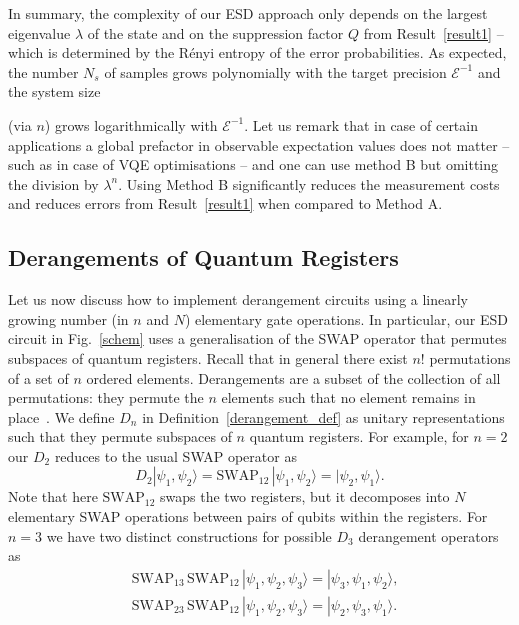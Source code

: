 \documentclass[aps,prx,showpacs,twocolumn,reprint]{revtex4-2}
\begin{document}
In summary, the complexity of our ESD approach only depends on the largest eigenvalue
$\lambda$ of the state and on the suppression factor $Q$ from
Result~\ref{result1} --  which is determined by the R{\'e}nyi entropy of the error probabilities.
As expected, the number $N_s$ of samples grows polynomially with the target precision
$\mathcal{E}^{-1}$ and the system size{(via $n$) grows logarithmically with $\mathcal{E}^{-1}$.
Let us remark that in case of certain applications a global prefactor in observable
expectation values does not matter
-- such as in case of VQE optimisations -- and one can use method B but omitting the division by $\lambda^n$. 
Using Method B significantly reduces the measurement costs and reduces errors from Result~\ref{result1}
when compared to Method A.




\subsection{Derangements of Quantum Registers}

Let us now discuss how to implement derangement circuits using a linearly growing number (in
$n$ and $N$) elementary gate operations. In particular, our
ESD circuit in Fig.~\ref{schem} uses a
generalisation of the SWAP operator that permutes subspaces of quantum registers.
Recall that in general there exist $n!$ permutations of a set of $n$ ordered elements.
Derangements are a subset of the collection of all permutations:
they permute the $n$ elements such that no element remains in place~\cite{roberts2009applied,sagan2013symmetric}.
We define $D_n$ in Definition~\ref{derangement_def} as unitary representations such that they permute
subspaces of $n$ quantum registers.
For example, for $n=2$ our $D_2$ reduces to the usual SWAP operator as
\begin{equation} \label{n2equation}
D_2 |\psi_1, \psi_2\rangle = \mathrm{SWAP}_{12} \, |\psi_1, \psi_2\rangle = |\psi_2, \psi_1\rangle.
\end{equation}
Note that here $\mathrm{SWAP}_{12}$ swaps the two registers, but it
decomposes into $N$ elementary SWAP operations between pairs of qubits within the registers.
For $n=3$ we have two distinct constructions for possible $D_3$ derangement operators as 
\begin{align*}
&\mathrm{SWAP}_{13} \,  \mathrm{SWAP}_{12} \, |\psi_1, \psi_2, \psi_3 \rangle = |\psi_3, \psi_1, \psi_2\rangle,\\
&\mathrm{SWAP}_{23} \, \mathrm{SWAP}_{12} \,  |\psi_1, \psi_2, \psi_3 \rangle = |\psi_2, \psi_3, \psi_1\rangle.
\end{align*}

}
\end{document}
